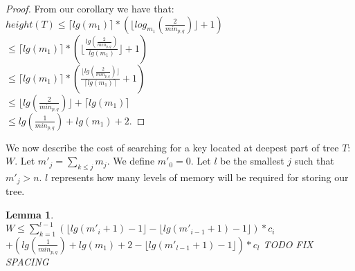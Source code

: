 \documentclass[letterpaper,12pt,titlepage,oneside,final]{book}
\theoremstyle{plain}
\newtheorem{lem}[thm]{Lemma}
\begin{document}
\begin{proof}
From our corollary we have that:\\
$height(T) \leq \lceil lg(m_1) \rceil * (\lfloor log_{m_1}(\frac{2}{min_{p,q}}) \rfloor + 1)$ \\

$ \leq \lceil lg(m_1) \rceil * (\lfloor \frac{lg(\frac{2}{min_{p,q}})}{lg(m_1)} \rfloor + 1)$\\

$ \leq \lceil lg(m_1) \rceil * ( \frac{ \lfloor lg(\frac{2}{min_{p,q}}) \rfloor}{\lceil lg(m_1) \rceil} + 1)$\\

$ \leq  \lfloor lg(\frac{2}{min_{p,q}}) \rfloor + \lceil lg(m_1) \rceil$\\

$ \leq  lg(\frac{1}{min_{p,q}}) + lg(m_1) + 2$.

\end{proof}


We now describe the cost of searching for a key located at deepest part of tree $T$: $W$. Let $m'_j = \sum_{k \leq j} m_j$. We define $m'_0 = 0$. Let $l$ be the smallest $j$ such that $m'_j > n$. $l$ represents how many levels of memory will be required for storing our tree.

\begin{lem} \hspace{1cm} \\
$W \leq \sum_{k=1}^{l-1} (\lfloor lg(m'_i+1)-1 \rfloor - \lfloor lg(m'_{i-1}+1)-1 \rfloor)*c_i$\\ $+ (lg(\frac{1}{min_{p,q}}) + lg(m_1) + 2 - \lfloor lg(m'_{l-1}+1)-1 \rfloor)*c_l$ TODO FIX SPACING
\end{lem}
\end{document}
